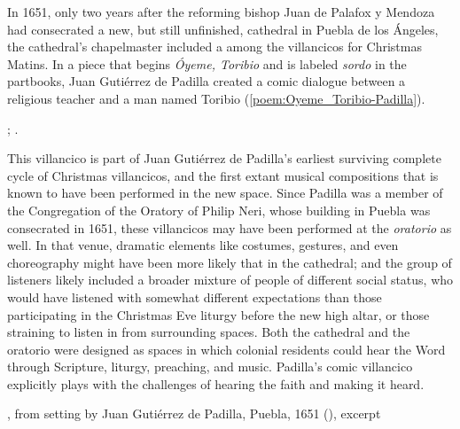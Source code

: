 In 1651, only two years after the reforming bishop Juan de Palafox y Mendoza had
consecrated a new, but still unfinished, cathedral in Puebla de los Ángeles, the
cathedral's chapelmaster included a  among the
villancicos for Christmas Matins.
In a piece that begins \emph{Óyeme, Toribio} and is labeled \emph{sordo} in the
partbooks, Juan Gutiérrez de Padilla created a comic dialogue between a
religious teacher and a  man named Toribio
(\cref{poem:Oyeme_Toribio-Padilla}).%
\begin{Footnote}
    ; \Autocites{Stanford:Catalog}{Puebla:Microfilm}.
\end{Footnote}
This villancico is part of Juan Gutiérrez de Padilla's earliest surviving
complete cycle of Christmas villancicos, and the first extant musical
compositions that is known to have been performed in the new space.%
    \Autocites{Cashner:Cards}{Mauleon:PadillaPalafox}
Since Padilla was a member of the Congregation of the Oratory of Philip Neri,
whose building in Puebla was consecrated in 1651, these villancicos may have
been performed at the \emph{oratorio} as well.
In that venue, dramatic elements like costumes, gestures, and even choreography
might have been more likely that in the cathedral; and the group of listeners
likely included a broader mixture of people of different social status, who
would have listened with somewhat different expectations than those
participating in the Christmas Eve liturgy before the new high altar, or those
straining to listen in from surrounding spaces.
Both the cathedral and the oratorio were designed as spaces in which colonial
residents could hear the Word through Scripture, liturgy, preaching, and music.
Padilla's comic  villancico explicitly plays with the challenges of
hearing the faith and making it heard.

\begin{poemexample}
    \caption{, from setting by Juan Gutiérrez
    de Padilla, Puebla, 1651 (), excerpt}

    \label{poem:Oyeme_Toribio-Padilla}
\end{poemexample}

